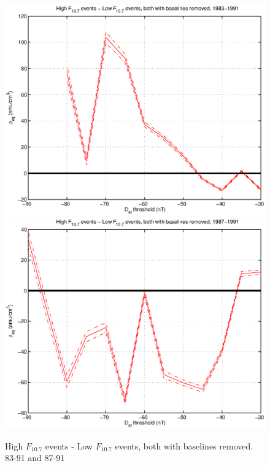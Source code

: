 \documentclass[10pt,twocolumn]{article}
\begin{document}
\begin{figure}[htp!]
\includegraphics[scale=0.45]{paperfigures/DstRhoThresh-1983-1991.eps}
\includegraphics[scale=0.45]{paperfigures/DstRhoThresh-1987-1991.eps}
\caption{High $F_{10.7}$ events - Low $F_{10.7}$ events, both with baselines removed. 83-91 and 87-91}
\end{figure}
\end{document}

